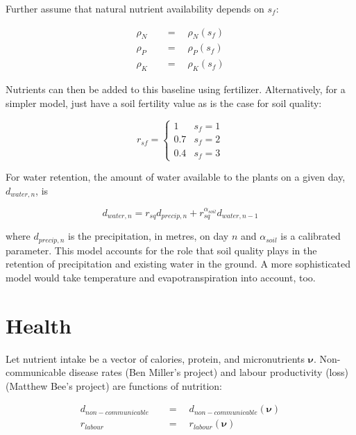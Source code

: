 \documentclass[letter,12pt]{article}
\begin{document}
Further assume that natural nutrient availability depends on $s_f$:

\begin{align}
\rho_{N} \quad &= \quad  \rho_{N} \left(s_f\right) \\
\rho_{P} \quad &= \quad  \rho_{P} \left(s_f\right) \\
\rho_{K} \quad &= \quad  \rho_{K} \left(s_f\right)
\end{align}

Nutrients can then be added to this baseline using fertilizer.  Alternatively, for a simpler model, just have a soil fertility value as is the case for soil quality:

\begin{equation}
r_{sf} = \left\{ \begin{array}{cc}
1			&s_f = 1 \\
0.7		&s_f = 2 \\
0.4		&s_f = 3
\end{array}
\right.
\end{equation}

For water retention, the amount of water available to the plants on a given day, $d_{water,n}$, is

\begin{equation}
d_{water,n} = r_{sq} d_{precip,n} +  r_{sq}^{\alpha_{soil}} d_{water,n-1}
\end{equation}

\noindent where $d_{precip,n}$ is the precipitation, in metres, on day $n$ and $\alpha_{soil}$ is a calibrated parameter.  This model accounts for the role that soil quality plays in the retention of precipitation and existing water in the ground.  A more sophisticated model would take temperature and evapotranspiration into account, too.

\section{Health}

Let nutrient intake be a vector of calories, protein, and micronutrients $\boldsymbol \nu$.  Non-communicable disease rates (Ben Miller's project) and labour productivity (loss) (Matthew Bee's project) are functions of nutrition:

\begin{align}
d_{non-communicable} \quad &= \quad  d_{non-communicable}\left(\boldsymbol \nu\right) \\
r_{labour} \quad &= \quad  r_{labour} \left( \boldsymbol \nu \right)
\end{align}
\end{document}
